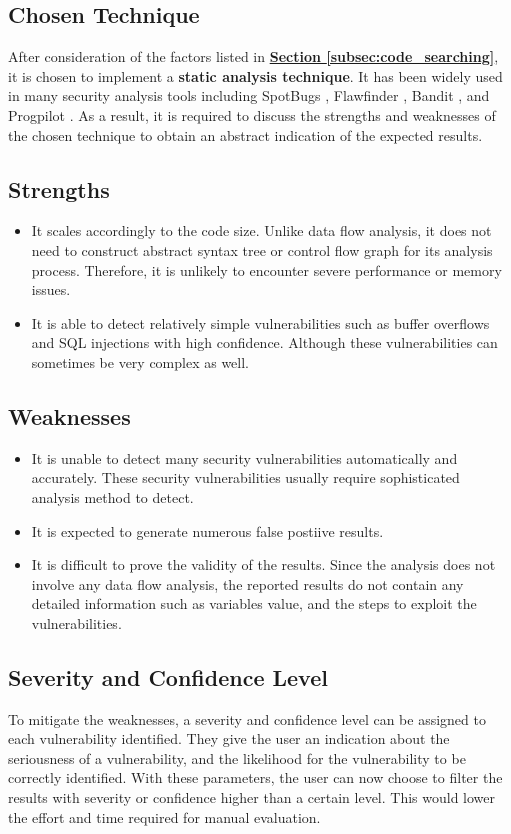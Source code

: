 \documentclass[12pt, a4paper]{report}
\begin{document}
\subsection{Chosen Technique}
After consideration of the factors listed in \hyperref[subsec:code_searching]{\textbf{Section
\ref*{subsec:code_searching}}}, it is chosen to implement a \textbf{static analysis technique}. It
has been widely used in many security analysis tools including SpotBugs \cite{spotbugs}, Flawfinder
\cite{flawfinder}, Bandit \cite{bandit}, and Progpilot \cite{progpilot}. As a result, it is required
to discuss the strengths and weaknesses of the chosen technique to obtain an abstract indication of
the expected results.

\subsection*{Strengths}
\begin{itemize}
  \item It scales accordingly to the code size. Unlike data flow analysis, it does not need to
  construct abstract syntax tree or control flow graph for its analysis process. Therefore, it is
  unlikely to encounter severe performance or memory issues.
  \item It is able to detect relatively simple vulnerabilities such as buffer overflows and SQL
  injections with high confidence. Although these vulnerabilities can sometimes be very  complex as
  well.
\end{itemize}

\subsection*{Weaknesses}
\begin{itemize}
  \item It is unable to detect many security vulnerabilities automatically and accurately. These
  security vulnerabilities usually require sophisticated analysis method to detect.
  \item It is expected to generate numerous false postiive results.
  \item It is difficult to prove the validity of the results. Since the analysis does not involve
  any data flow analysis, the reported results do not contain any detailed information such as
  variables value, and the steps to exploit the vulnerabilities.
\end{itemize}

\subsection{Severity and Confidence Level}
To mitigate the weaknesses, a severity and confidence level can be assigned to each vulnerability
identified. They give the user an indication about the seriousness of a vulnerability, and the
likelihood for the vulnerability to be correctly identified. With these parameters, the user can now
choose to filter the results with severity or confidence higher than a certain level. This would
lower the effort and time required for manual evaluation.
\end{document}
